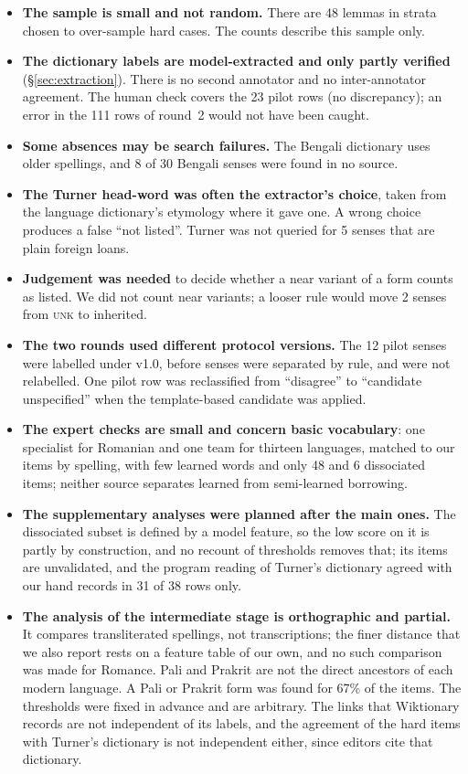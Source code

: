 \documentclass[11pt]{article}
\newcommand{\lbl}[1]{\textsc{#1}}
\begin{document}
\begin{itemize}
\item \textbf{The sample is small and not random.} There are 48 lemmas in strata chosen to over-sample hard cases. The counts describe this sample only.
\item \textbf{The dictionary labels are model-extracted and only partly verified} (\S\ref{sec:extraction}). There is no second annotator and no inter-annotator agreement. The human check covers the 23 pilot rows (no discrepancy); an error in the 111 rows of round~2 would not have been caught.
\item \textbf{Some absences may be search failures.} The Bengali dictionary uses older spellings, and 8 of 30 Bengali senses were found in no source.
\item \textbf{The Turner head-word was often the extractor's choice}, taken from the language dictionary's etymology where it gave one. A wrong choice produces a false ``not listed''. Turner was not queried for 5 senses that are plain foreign loans.
\item \textbf{Judgement was needed} to decide whether a near variant of a form counts as listed. We did not count near variants; a looser rule would move 2 senses from \lbl{unk} to inherited.
\item \textbf{The two rounds used different protocol versions.} The 12 pilot senses were labelled under v1.0, before senses were separated by rule, and were not relabelled. One pilot row was reclassified from ``disagree'' to ``candidate unspecified'' when the template-based candidate was applied.
\item \textbf{The expert checks are small and concern basic vocabulary}: one specialist for Romanian and one team for thirteen languages, matched to our items by spelling, with few learned words and only 48 and 6 dissociated items; neither source separates learned from semi-learned borrowing.
\item \textbf{The supplementary analyses were planned after the main ones.} The dissociated subset is defined by a model feature, so the low score on it is partly by construction, and no recount of thresholds removes that; its items are unvalidated, and the program reading of Turner's dictionary agreed with our hand records in 31 of 38 rows only.
\item \textbf{The analysis of the intermediate stage is orthographic and partial.} It compares transliterated spellings, not transcriptions; the finer distance that we also report rests on a feature table of our own, and no such comparison was made for Romance. Pali and Prakrit are not the direct ancestors of each modern language. A Pali or Prakrit form was found for 67\% of the items. The thresholds were fixed in advance and are arbitrary. The links that Wiktionary records are not independent of its labels, and the agreement of the hard items with Turner's dictionary is not independent either, since editors cite that dictionary.

\end{itemize}
\end{document}
